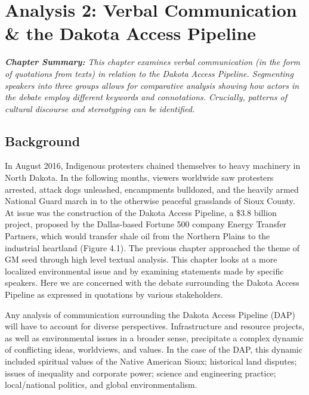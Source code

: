 \chapter{Analysis 2: Verbal Communication \& the Dakota Access Pipeline}

\textit{\textbf{Chapter Summary:} This chapter examines verbal communication (in the form of quotations from texts) in relation to the Dakota Access Pipeline. Segmenting speakers into three groups allows for comparative analysis showing how actors in the debate employ different keywords and connotations. Crucially, patterns of cultural discourse and stereotyping can be identified.}
\newline

\section{Background}

In August 2016, Indigenous protesters chained themselves to heavy machinery in North Dakota. In the following months, viewers worldwide saw protesters arrested, attack dogs unleashed, encampments bulldozed, and the heavily armed National Guard march in to the otherwise peaceful grasslands of Sioux County. At issue was the construction of the Dakota Access Pipeline, a \$3.8 billion project, proposed by the Dallas-based Fortune 500 company Energy Transfer Partners, which would transfer shale oil from the Northern Plains to the industrial heartland (Figure 4.1). The previous chapter approached the theme of GM seed through high level textual analysis. This chapter looks at a more localized environmental issue and by examining statements made by specific speakers. Here we are concerned with the debate surrounding the Dakota Access Pipeline as expressed in quotations by various stakeholders. 

Any analysis of communication surrounding the Dakota Access Pipeline (DAP) will have to account for diverse perspectives. Infrastructure and resource projects, as well as environmental issues in a broader sense, precipitate a complex dynamic of conflicting ideas, worldviews, and values. In the case of the DAP, this dynamic included spiritual values of the Native American Sioux; historical land disputes; issues of inequality and corporate power; science and engineering practice; local/national politics, and global environmentalism. 

